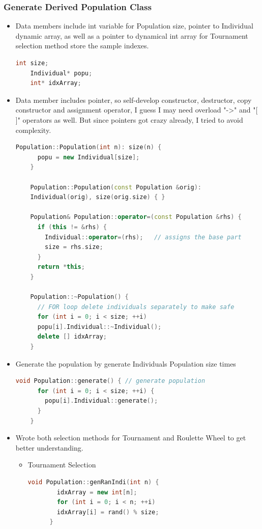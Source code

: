 \documentclass{article}
\begin{document}
\begin{CJK}{UTF8}{gbsn}
\subsubsection{Generate Derived Population Class}
\begin{itemize}
  \itemsep=-3pt

\item Data members include int variable for Population size, pointer to Individual dynamic array, as well as a pointer to dynamical int array for Tournament selection method store the sample indexes. 
  \begin{lstlisting}[language=c++]
    int size;
    Individual* popu;
    int* idxArray;
  \end{lstlisting}

\item Data member includes pointer, so self-develop constructor, destructor, copy constructor and assignment operator, I guess I may need overload "->" and "[ ]" operators as well. But since pointers got crazy already, I tried to avoid complexity. 
  \begin{lstlisting}[language=c++]
    Population::Population(int n): size(n) {
      popu = new Individual[size];
    }

    Population::Population(const Population &orig):
    Individual(orig), size(orig.size) { }

    Population& Population::operator=(const Population &rhs) {
      if (this != &rhs) {
        Individual::operator=(rhs);   // assigns the base part
        size = rhs.size;
      }
      return *this;
    }

    Population::~Population() {
      // FOR loop delete individuals separately to make safe
      for (int i = 0; i < size; ++i) 
      popu[i].Individual::~Individual();	 
      delete [] idxArray;
    }
  \end{lstlisting}

\item Generate the population by generate Individuals Population size times
  \begin{lstlisting}[language=c++]
    void Population::generate() { // generate population
      for (int i = 0; i < size; ++i) {
        popu[i].Individual::generate();
      }
    }
  \end{lstlisting}

\item Wrote both selection methods for Tournament and Roulette Wheel to get better understanding. 
  \begin{itemize}
    \itemsep=-3pt
  \item Tournament Selection
    \begin{lstlisting}[language=c++]
      void Population::genRanIndi(int n) {
        idxArray = new int[n];
        for (int i = 0; i < n; ++i) 
        idxArray[i] = rand() % size;
      }


\end{lstlisting}
\end{itemize}
\end{itemize}
\end{CJK}
\end{document}
